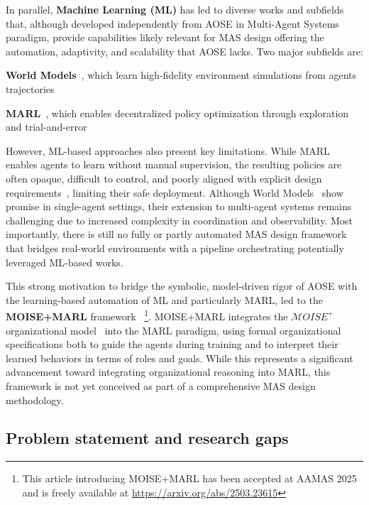 \documentclass[pdflatex,sn-mathphys-num]{sn-jnl}%
\theoremstyle{thmstyleone}%
\theoremstyle{thmstyletwo}%
\theoremstyle{thmstylethree}%
\begin{document}
In parallel, \textbf{Machine Learning (ML)} has led to diverse works and subfields that, although developed independently from AOSE in Multi-Agent Systems paradigm, provide capabilities likely relevant for MAS design offering the automation, adaptivity, and scalability that AOSE lacks. Two major subfields are:
\begin{enumerate*}[label={\roman*)}, itemjoin={; \quad}]
    \item \textbf{World Models}~\cite{Ha2018}, which learn high-fidelity environment simulations from agents trajectories
    \item \textbf{MARL}~\cite{Zhang2021, Papoudakis2021}, which enables decentralized policy optimization through exploration and trial-and-error
\end{enumerate*}

However, ML-based approaches also present key limitations. While MARL enables agents to learn without manual supervision, the resulting policies are often opaque, difficult to control, and poorly aligned with explicit design requirements~\cite{Nguyen2020, Anastassacos2020}, limiting their safe deployment.
Although World Models~\cite{Ha2018} show promise in single-agent settings, their extension to multi-agent systems remains challenging due to increased complexity in coordination and observability.
Most importantly, there is still no fully or partly automated MAS design framework that bridges real-world environments with a pipeline orchestrating potentially leveraged ML-based works.

This strong motivation to bridge the symbolic, model-driven rigor of AOSE with the learning-based automation of ML and particularly MARL, led to the \textbf{MOISE+MARL} framework~\cite{soule2025moisemarl}%
\footnote{This article introducing MOISE+MARL has been accepted at AAMAS 2025 and is freely available at \url{https://arxiv.org/abs/2503.23615}}.
%
MOISE+MARL integrates the $\mathcal{M}OISE^+$ organizational model~\cite{Hubner2002} into the MARL paradigm, using formal organizational specifications both to guide the agents during training and to interpret their learned behaviors in terms of roles and goals. While this represents a significant advancement toward integrating organizational reasoning into MARL, this framework is not yet conceived as part of a comprehensive MAS design methodology.

\subsection{Problem statement and research gaps}
\end{document}

